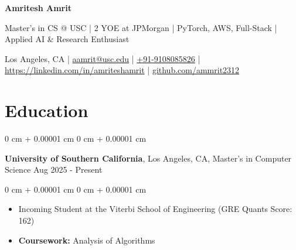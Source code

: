 \documentclass[10pt, a4paper]{article}
\newenvironment{highlights}{
    \begin{itemize}[
        topsep=0.10 cm,
        parsep=0.10 cm,
        partopsep=0pt,
        itemsep=0pt,
        leftmargin=0 cm + 10pt
    ]
}{
    \end{itemize}
} %
\newenvironment{onecolentry}{
    \begin{adjustwidth}{
        0 cm + 0.00001 cm
    }{
        0 cm + 0.00001 cm
    }
}{
    \end{adjustwidth}
} %
\newenvironment{twocolentry}[2][]{
    \onecolentry
    \def\secondColumn{#2}
    \setcolumnwidth{\fill, 6.0 cm}
    \begin{paracol}{2}
}{
    \switchcolumn \raggedleft \secondColumn
    \end{paracol}
    \endonecolentry
} %
\newenvironment{header}{
    \setlength{\topsep}{0pt}\par\kern\topsep\centering\linespread{1.0}
}{
    \par\kern\topsep
} %
\begin{document}
    \newcommand{\AND}{\unskip
        \cleaders\copy\ANDbox\hskip\wd\ANDbox
        \ignorespaces
    }
    \newsavebox\ANDbox
    \sbox\ANDbox{$|$}

    \begin{header}
    \fontsize{20 pt}{20 pt}\selectfont \textbf{Amritesh Amrit}

    \vspace{1pt} %

    \normalsize
    Master’s in CS @ USC | 2 YOE at JPMorgan | PyTorch, AWS, Full-Stack | Applied AI \& Research Enthusiast

    \vspace{2pt} %

    \normalsize
    Los Angeles, CA | \href{mailto:aamrit@usc.edu}{aamrit@usc.edu} | \href{tel:+91-9108085826}{+91-9108085826} | \href{https://linkedin.com/in/amriteshamrit}{https://linkedin.com/in/amriteshamrit} | \href{https://github.com/ammrit2312}{github.com/ammrit2312}


\end{header}

    \vspace{5 pt - 0.3 cm}

    \section{Education}
        \begin{twocolentry}{
            Aug 2025 - Present
        }
            \textbf{University of Southern California}, Los Angeles, CA, Master's in Computer Science\end{twocolentry}

        \vspace{0.10 cm}
        \begin{onecolentry}
            \begin{highlights}
                \item Incoming Student at the Viterbi School of Engineering (GRE Quants Score: 162)
                \item \textbf{Coursework:} Analysis of Algorithms
            \end{highlights}
        \end{onecolentry}
\end{document}
